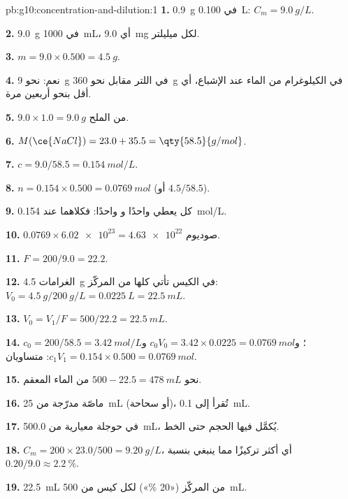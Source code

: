 \begin{solution}{pb:g10:concentration-and-dilution:1}
\textbf{1.} \qty{0.9}{g} في \qty{0.100}{L}: $C_m = \qty{9.0}{g/L}$.

\textbf{2.} \qty{9.0}{g} في \qty{1000}{mL}، أي \qty{9.0}{mg} لكل
ميليلتر.

\textbf{3.} $m = 9.0 \times 0.500 = \qty{4.5}{g}$.

\textbf{4.} نعم: نحو \qty{9}{g} في اللتر مقابل نحو \qty{360}{g} في
الكيلوغرام من الماء عند الإشباع، أي أقل بنحو أربعين مرة.

\textbf{5.} $9.0 \times 1.0 = \qty{9.0}{g}$ من الملح.

\textbf{6.} $M(\ce{NaCl}) = 23.0 + 35.5 = \qty{58.5}{g/mol}$.

\textbf{7.} $c = 9.0 / 58.5 = \qty{0.154}{mol/L}$.

\textbf{8.} $n = 0.154 \times 0.500 = \qty{0.0769}{mol}$ (أو
$4.5 / 58.5$).

\textbf{9.} كل  يعطي  واحدًا و واحدًا: فكلاهما عند
\qty{0.154}{mol/L}.

\textbf{10.} $0.0769 \times \num{6.02e23} = \num{4.63e22}$  صوديوم.

\textbf{11.} $F = 200 / 9.0 = 22.2$.

\textbf{12.} الغرامات \qty{4.5}{g} في الكيس تأتي كلها من  المركّز:
$V_0 = \qty{4.5}{g} / \qty{200}{g/L} = \qty{0.0225}{L} =
\qty{22.5}{mL}$.

\textbf{13.} $V_0 = V_1 / F = 500 / 22.2 = \qty{22.5}{mL}$.

\textbf{14.} $c_0 = 200 / 58.5 = \qty{3.42}{mol/L}$؛
و$c_0 V_0 = 3.42 \times 0.0225 = \qty{0.0769}{mol}$
و$c_1 V_1 = 0.154 \times 0.500 = \qty{0.0769}{mol}$: متساويان.

\textbf{15.} نحو $500 - 22.5 = \qty{478}{mL}$ من الماء المعقم.

\textbf{16.} ماصّة مدرّجة من \qty{25}{mL} (أو سحاحة)، تُقرأ إلى
\qty{0.1}{mL}.

\textbf{17.} في حوجلة معيارية من \qty{500.0}{mL}، يُكمَّل فيها الحجم حتى الخط.

\textbf{18.} $C_m = 200 \times 23.0 / 500 = \qty{9.20}{g/L}$، أي أكثر تركيزًا
مما ينبغي بنسبة $0.20 / 9.0 \approx \qty{2.2}{\percent}$.

\textbf{19.} \qty{22.5}{mL} من  المركّز («20 \%») لكل كيس من
\qty{500}{mL}.
\end{solution}
